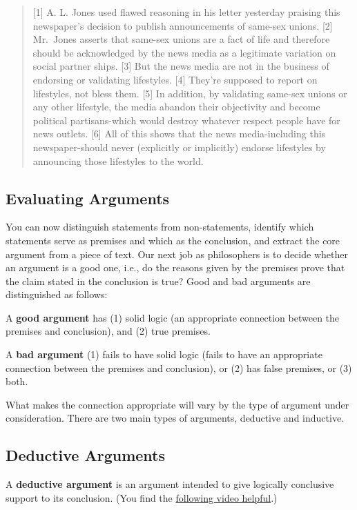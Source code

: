 \documentclass[]{article}
\begin{document}
\begin{quote}
{[}1{]} A. L. Jones used flawed reasoning in his letter yesterday
praising this newspaper's decision to publish announcements of same-sex
unions. {[}2{]} Mr.~Jones asserts that same-sex unions are a fact of
life and therefore should be acknowledged by the news media as a
legitimate variation on social partner ships. {[}3{]} But the news media
are not in the business of endorsing or validating lifestyles. {[}4{]}
They're supposed to report on lifestyles, not bless them. {[}5{]} In
addition, by validating same-sex unions or any other lifestyle, the
media abandon their objectivity and become political partisans-which
would destroy whatever respect people have for news outlets. {[}6{]} All
of this shows that the news media-including this newspaper-should never
(explicitly or implicitly) endorse lifestyles by announcing those
lifestyles to the world.
\end{quote}

\subsection{Evaluating Arguments}\label{evaluating-arguments}

You can now distinguish statements from non-statements, identify which
statements serve as premises and which as the conclusion, and extract
the core argument from a piece of text. Our next job as philosophers is
to decide whether an argument is a good one, i.e., do the reasons given
by the premises prove that the claim stated in the conclusion is true?
Good and bad arguments are distinguished as follows:

A \textbf{good argument} has (1) solid logic (an appropriate connection
between the premises and conclusion), and (2) true premises.

A \textbf{bad argument} (1) fails to have solid logic (fails to have an
appropriate connection between the premises and conclusion), or (2) has
false premises, or (3) both.

What makes the connection appropriate will vary by the type of argument
under consideration. There are two main types of arguments, deductive
and inductive.

\subsection{Deductive Arguments}\label{deductive-arguments}

A \textbf{deductive argument} is an argument intended to give logically
conclusive support to its conclusion. (You find the
\href{http://www.wi-phi.com/video/deductive-arguments}{following video
helpful}.)
\end{document}
